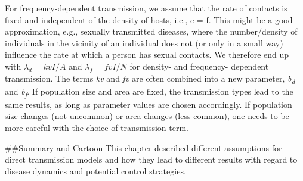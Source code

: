 \documentclass[]{book}
\theoremstyle{definition}
\theoremstyle{definition}
\theoremstyle{definition}
\theoremstyle{remark}
\begin{document}
For frequency-dependent transmission, we assume that the rate of
contacts is fixed and independent of the density of hosts, i.e., c = f.
This might be a good approximation, e.g., sexually transmitted diseases,
where the number/density of individuals in the vicinity of an individual
does not (or only in a small way) influence the rate at which a person
has sexual contacts. We therefore end up with \(\lambda_d= kv I/A\) and
\(\lambda_f= fv I/N\) for density- and frequency- dependent
transmission. The terms \emph{kv} and \emph{fv} are often combined into
a new parameter, \emph{b\textsubscript{d}} and
\emph{b\textsubscript{f}}. If population size and area are fixed, the
transmission types lead to the same results, as long as parameter values
are chosen accordingly. If population size changes (not uncommon) or
area changes (less common), one needs to be more careful with the choice
of transmission term.

\#\#Summary and Cartoon This chapter described different assumptions for
direct transmission models and how they lead to different results with
regard to disease dynamics and potential control strategies.
\end{document}
